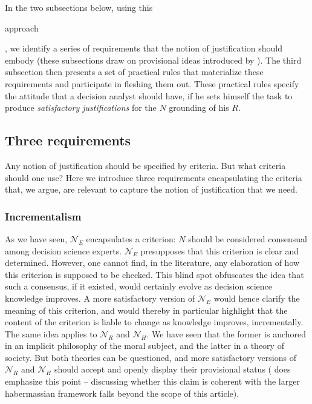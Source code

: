 \documentclass[preprint, french, english, 11pt, authoryear]{elsarticle}%
\begin{document}
In the two subsections below, using this \begin{changebar}approach\end{changebar}, we identify a series of requirements that the notion of justification should embody (these subsections draw on provisional ideas introduced by \citet{meinard_du_2013, meinard_what_2017}). 
The third subsection then presents a set of practical rules that materialize these requirements and participate in fleshing them out. These practical rules specify the attitude that a decision analyst should have, if he sets himself the task to produce \emph{satisfactory justifications} for the $N$ grounding of his $R$.

\subsection{Three requirements}

Any notion of justification should be specified by criteria. But what criteria should one use? Here we introduce three requirements encapsulating the criteria that, we argue, are relevant to capture the notion of justification that we need.

\subsubsection{Incrementalism}
As we have seen, $\mathscr{N}_E$ encapsulates a criterion: $N$ should be considered consensual among decision science experts. $\mathscr{N}_E$ presupposes that this criterion is clear and determined. However, one cannot find, in the literature, any elaboration of how this criterion is supposed to be checked. 
This blind spot obfuscates the idea that such a consensus, if it existed, would certainly evolve as decision science knowledge improves. 
A more satisfactory version of $\mathscr{N}_E$ would hence clarify the meaning of this criterion, and would thereby in particular highlight that the content of the criterion is liable to change as knowledge improves, incrementally. The same idea applies to $\mathscr{N}_{R}$ and $\mathscr{N}_{H}$. 
We have seen that the former is anchored in an implicit philosophy of the moral subject, and the latter in a theory of society. 
But both theories can be questioned, and more satisfactory versions of $\mathscr{N}_{R}$ and $\mathscr{N}_{H}$ should accept and openly display their provisional status 
(\cite{habermas_moralbewustsein_1983} does emphasize this point -- discussing whether this claim is coherent with the larger habermassian framework falls beyond the scope of this article).
\end{document}
